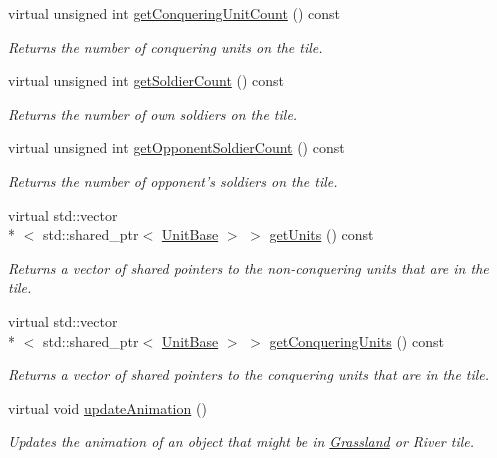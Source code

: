 \begin{DoxyCompactItemize}
virtual unsigned int \hyperlink{class_course_1_1_tile_base_a9798c1cf99f7dcc4927d1561ec41079e}{get\-Conquering\-Unit\-Count} () const 
\begin{DoxyCompactList}\small\item\em Returns the number of conquering units on the tile. \end{DoxyCompactList}\item 
virtual unsigned int \hyperlink{class_course_1_1_tile_base_af8a063cc31be281fdfa98c4d9725dd2b}{get\-Soldier\-Count} () const 
\begin{DoxyCompactList}\small\item\em Returns the number of own soldiers on the tile. \end{DoxyCompactList}\item 
virtual unsigned int \hyperlink{class_course_1_1_tile_base_a2b8a9cbb638de74dad63967c77876d85}{get\-Opponent\-Soldier\-Count} () const 
\begin{DoxyCompactList}\small\item\em Returns the number of opponent's soldiers on the tile. \end{DoxyCompactList}\item 
virtual std\-::vector\\*
$<$ std\-::shared\-\_\-ptr$<$ \hyperlink{class_course_1_1_unit_base}{Unit\-Base} $>$ $>$ \hyperlink{class_course_1_1_tile_base_a25cd5fb6e407e637ff5ade01f78ec374}{get\-Units} () const 
\begin{DoxyCompactList}\small\item\em Returns a vector of shared pointers to the non-\/conquering units that are in the tile. \end{DoxyCompactList}\item 
virtual std\-::vector\\*
$<$ std\-::shared\-\_\-ptr$<$ \hyperlink{class_course_1_1_unit_base}{Unit\-Base} $>$ $>$ \hyperlink{class_course_1_1_tile_base_ad55f272baa2b7f8c813bba65003fee9c}{get\-Conquering\-Units} () const 
\begin{DoxyCompactList}\small\item\em Returns a vector of shared pointers to the conquering units that are in the tile. \end{DoxyCompactList}\item 
virtual void \hyperlink{class_course_1_1_tile_base_a3889af6b1fc5f16656f46f030aed34d9}{update\-Animation} ()
\begin{DoxyCompactList}\small\item\em Updates the animation of an object that might be in \hyperlink{class_course_1_1_grassland}{Grassland} or River tile. \end{DoxyCompactList}\item 

\end{DoxyCompactItemize}
